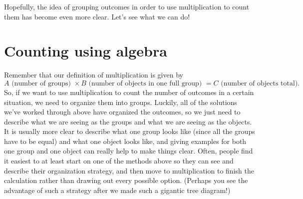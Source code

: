 \documentclass{ximera}
\begin{document}
Hopefully, the idea of grouping outcomes in order to use multiplication to count them has become even more clear. Let's see what we can do!



\section{Counting using algebra}
Remember that our definition of multiplication is given by
\[
A \textrm{ (number of groups) } \times B \textrm{ (number of objects in one full group) } = C \textrm{ (number of objects total)}.
\]
So, if we want to use multiplication to count the number of outcomes in a certain situation, we need to organize them into groups. Luckily, all of the solutions we've worked through above have organized the outcomes, so we just need to describe what we are seeing as the groups and what we are seeing as the objects. It is usually more clear to describe what one group looks like (since all the groups have to be equal) and what one object looks like, and giving examples for both one group and one object can really help to make things clear. Often, people find it easiest to at least start on one of the methods above so they can see and describe their organization strategy, and then move to multiplication to finish the calculation rather than drawing out every possible option. (Perhaps you see the advantage of such a strategy after we made such a gigantic tree diagram!)
\end{document}
